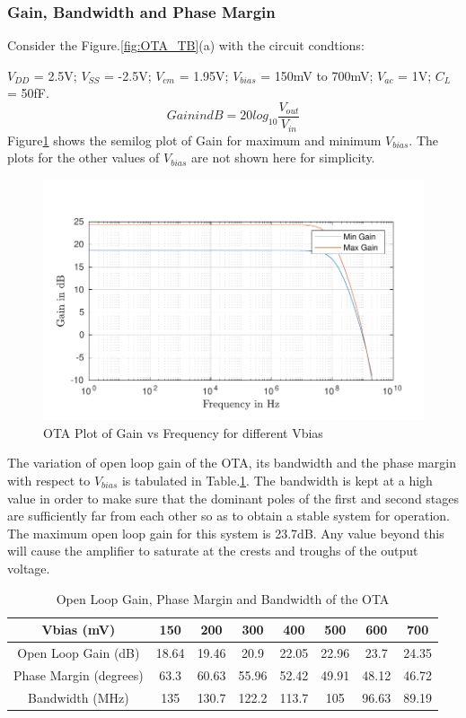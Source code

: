 \subsubsection{Gain, Bandwidth and Phase Margin}
Consider the Figure.\ref{fig:OTA_TB}(a) with the circuit condtions:

$V_{DD}$ = 2.5V; $V_{SS}$ = -2.5V; $V_{cm}$ = 1.95V; $V_{bias}$ = 150mV to 700mV;  $V_{ac}$ = 1V; $C_{L}$ = 50fF.
$$Gain in dB = 20 log_{10}\frac{V_{out}}{V_{in}}$$
Figure\ref{fig:OTA_Gain} shows the semilog plot of Gain for maximum and minimum $V_{bias}$. The plots for the other values of $V_{bias}$ are not shown here for simplicity.

\begin{figure} [H]
\centering
\includegraphics[scale=1]{Figures/Plots/OTA_Gain.pdf}
\caption{OTA Plot of Gain vs Frequency for different Vbias}
\label{fig:OTA_Gain}
\end{figure}

The variation of open loop gain of the OTA, its bandwidth and the phase margin with respect to $V_{bias}$ is tabulated in Table.\ref{tab:OTA_gain_bw_pm}. The bandwidth is kept at a high value in order to make sure that the dominant poles of the first and second stages are sufficiently far from each other so as to obtain a stable system for operation. The maximum open loop gain for this system is 23.7dB. Any value beyond this will cause the amplifier to saturate at the crests and troughs of the output voltage.

\begin{table} [H]
\centering
\begin{tabular}{@{}cccccccc@{}}
\toprule
Vbias (mV)					& 150		& 200		& 300		& 400		& 500		& 600		& 700 \\ \midrule
Open Loop Gain (dB)			& 18.64		& 19.46		& 20.9		& 22.05		& 22.96		& 23.7		& 24.35 \\
Phase Margin (degrees)		& 63.3		& 60.63		& 55.96		& 52.42		& 49.91		& 48.12		& 46.72 \\
Bandwidth (MHz)				& 135		& 130.7		& 122.2		& 113.7		& 105		& 96.63		& 89.19 \\
\bottomrule
\end{tabular}
\caption{Open Loop Gain, Phase Margin and Bandwidth of the OTA}
\label{tab:OTA_gain_bw_pm}
\end{table}

